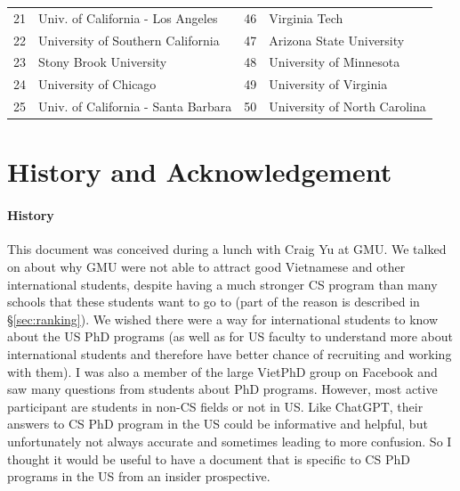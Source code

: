 \documentclass[11pt]{article}
\newcommand{\red}[1]{{\color{red}{#1}}}
\begin{document}
\begin{table}
\begin{tabular}{rl|rl}
    21 & Univ. of California - Los Angeles &46& Virginia Tech\red{$^*$}  \\
    22 & University of Southern California &47&  Arizona State University\red{$^*$} \\
    23 & Stony Brook University\red{$^*$} &48&University of Minnesota \\
    24 & University of Chicago &49& University of Virginia \\
    25 & Univ. of California - Santa Barbara &50& University of North Carolina\red{$^*$} \\
    \bottomrule
    \end{tabular}
\end{table}



\section{History and Acknowledgement}

\paragraph{History} This document was conceived during a lunch with Craig Yu at GMU.  We talked on about why GMU were not able to attract good Vietnamese and other international students, despite having a much stronger CS program than many schools that these students want to go to (part of the reason is described in \S\ref{sec:ranking}). We wished there were a way for international students to know about the US PhD programs (as well as for US faculty to understand more about international students and therefore have better chance of recruiting and working with them). I was also  a member of the large VietPhD group on Facebook and saw many questions from students about PhD programs.  However, most active participant are students in non-CS fields or not in US. Like ChatGPT, their answers to CS PhD program in the US could be informative and helpful, but unfortunately not always accurate and sometimes leading to more confusion. So I thought it would be useful to have a document that is specific to CS PhD programs in the US from an insider prospective.  
\end{document}
